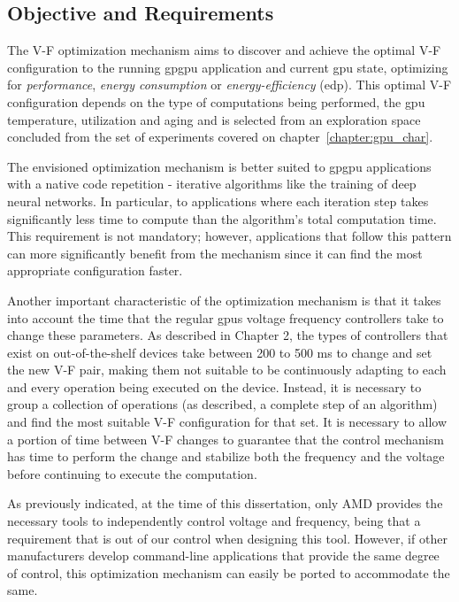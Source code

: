 \subsection{Objective and Requirements}

The V-F optimization mechanism aims to discover and achieve the optimal V-F configuration to the running \acrshort{gpgpu} application and current \acrshort{gpu} state, optimizing for \textit{performance}, \textit{energy consumption} or \textit{energy-efficiency} (\acrshort{edp}). This optimal V-F configuration depends on the type of computations being performed, the \acrshort{gpu} temperature, utilization and aging and is selected from an exploration space concluded from the set of experiments covered on chapter~\ref{chapter:gpu_char}. 

The envisioned optimization mechanism is better suited to \acrshort{gpgpu} applications with a native code repetition - iterative algorithms like the training of deep neural networks. In particular, to applications where each iteration step takes significantly less time to compute than the algorithm's total computation time. This requirement is not mandatory; however, applications that follow this pattern can more significantly benefit from the mechanism since it can find the most appropriate configuration faster.

Another important characteristic of the optimization mechanism is that it takes into account the time that the regular \acrshort{gpu}s voltage frequency controllers take to change these parameters. As described in Chapter 2, the types of controllers that exist on out-of-the-shelf devices take between 200 to 500 ms to change and set the new V-F pair, making them not suitable to be continuously adapting to each and every operation being executed on the device. Instead, it is necessary to group a collection of operations (as described, a complete step of an algorithm) and find the most suitable V-F configuration for that set.
It is necessary to allow a portion of time between V-F changes to guarantee that the control mechanism has time to perform the change and stabilize both the frequency and the voltage before continuing to execute the computation.

As previously indicated, at the time of this dissertation, only AMD provides the necessary tools to independently control voltage and frequency, being that a requirement that is out of our control when designing this tool. However, if other manufacturers develop command-line applications that provide the same degree of control, this optimization mechanism can easily be ported to accommodate the same.


